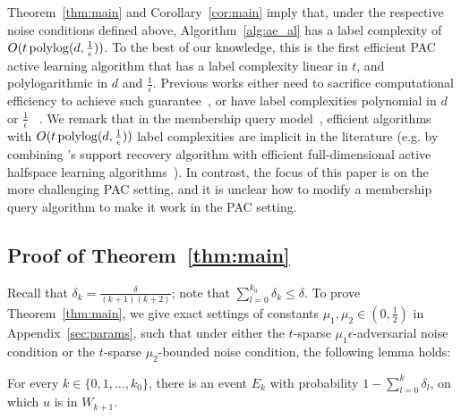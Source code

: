 Theorem~\ref{thm:main} and Corollary~\ref{cor:main} imply that, under the respective noise conditions defined above, Algorithm~\ref{alg:ae_al}
has a label complexity of $O( t \operatorname{polylog}(d,  \frac 1 \epsilon) )$. To the best of our knowledge, this
is the first efficient PAC active learning algorithm that has a label complexity linear in $t$, and polylogarithmic
in $d$ and $\frac 1 \epsilon$. Previous works either need to sacrifice computational efficiency to achieve such guarantee~\citep{D05,ZC14}, or have label complexities polynomial in $d$ or $\frac 1 \epsilon$ ~\citep{ABL17, ABHZ16}. We remark that in the membership query model~\citep{A88, BB08}, efficient algorithms with $O( t \operatorname{polylog}(d,  \frac 1 \epsilon) )$ label complexities are implicit in the literature (e.g. by combining \cite{HB11}'s support recovery algorithm with efficient full-dimensional active halfspace learning algorithms~\citep{DKM05,ABL17,CHK17,YZ17}). In contrast, the focus of this paper is on the more challenging PAC setting, and it is unclear how to modify a membership query algorithm to make it work in the PAC setting.


\subsection{Proof of Theorem~\ref{thm:main}}
Recall that $\delta_k = \frac{\delta}{(k+1)(k+2)}$; note that $\sum_{l=0}^{k_0} \delta_k \leq \delta$. To prove Theorem~\ref{thm:main}, we give exact settings of constants $\mu_1, \mu_2 \in (0, \frac 1 2)$ in Appendix~\ref{sec:params},
such that under either the $t$-sparse $\mu_1\epsilon$-adversarial noise condition or the $t$-sparse
$\mu_2$-bounded noise condition, the following lemma holds:
\begin{lemma}
	For every $k \in \{ 0,1,\ldots,k_0 \}$, there is an event $E_k$ with probability $1-\sum_{l=0}^k \delta_l$, on which $u$ is in $W_{k+1}$.
  \label{lem:induct}
\end{lemma}

